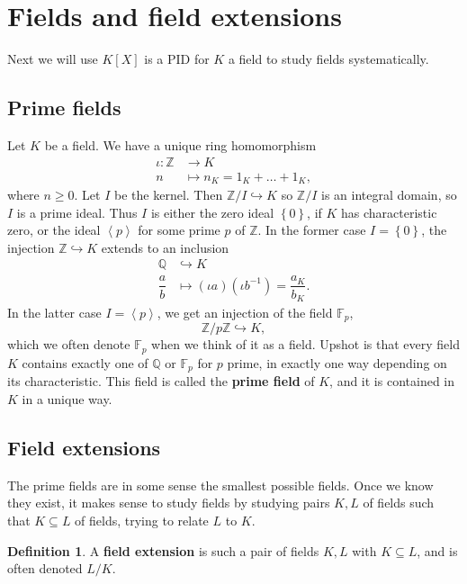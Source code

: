 \documentclass{article}
\newcommand{\F}{\mathbb{F}}
\newcommand{\Z}{\mathbb{Z}}
\newcommand{\Q}{\mathbb{Q}}
\newcommand{\rb}[1]{\left( #1 \right)}
\renewcommand{\sb}[1]{\left[ #1 \right]}
\newcommand{\cb}[1]{\left\{ #1 \right\}}
\newcommand{\ab}[1]{\left\langle #1 \right\rangle}
\theoremstyle{definition}\newtheorem{definition}{Definition}[subsection]
\theoremstyle{definition}\newtheorem{remark}[definition]{Remark}
\theoremstyle{definition}\newtheorem*{example}{Example}
\theoremstyle{definition}\newtheorem*{note}{Note}
\begin{document}
\section{Fields and field extensions}

Next we will use $ K\sb{X} $ is a PID for $ K $ a field to study fields systematically.

\subsection{Prime fields}

Let $ K $ be a field. We have a unique ring homomorphism
\begin{align*}
\iota : \Z & \to K \\
n & \mapsto n_K = 1_K + \dots + 1_K,
\end{align*}
where $ n \ge 0 $. Let $ I $ be the kernel. Then $ \Z / I \hookrightarrow K $ so $ \Z / I $ is an integral domain, so $ I $ is a prime ideal. Thus $ I $ is either the zero ideal $ \cb{0} $, if $ K $ has characteristic zero, or the ideal $ \ab{p} $ for some prime $ p $ of $ \Z $. In the former case $ I = \cb{0} $, the injection $ \Z \hookrightarrow K $ extends to an inclusion
\begin{align*}
\Q & \hookrightarrow K \\
\dfrac{a}{b} & \mapsto \rb{\iota a}\rb{\iota b^{-1}} = \dfrac{a_K}{b_K}.
\end{align*}
In the latter case $ I = \ab{p} $, we get an injection of the field $ \F_p $,
$$ \Z / p\Z \hookrightarrow K, $$
which we often denote $ \F_p $ when we think of it as a field. Upshot is that every field $ K $ contains exactly one of $ \Q $ or $ \F_p $ for $ p $ prime, in exactly one way depending on its characteristic. This field is called the \textbf{prime field} of $ K $, and it is contained in $ K $ in a unique way.

\subsection{Field extensions}

The prime fields are in some sense the smallest possible fields. Once we know they exist, it makes sense to study fields by studying pairs $ K, L $ of fields such that $ K \subseteq L $ of fields, trying to relate $ L $ to $ K $.

\begin{definition}
A \textbf{field extension} is such a pair of fields $ K, L $ with $ K \subseteq L $, and is often denoted $ L / K $.
\end{definition}
\end{document}
